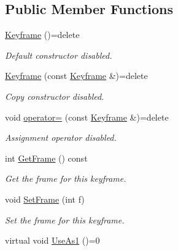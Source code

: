 \subsection*{Public Member Functions}
\begin{DoxyCompactItemize}
\item 
\hypertarget{class_c_anim_channel_1_1_keyframe_a88096d3eecc2aa502bae62906107c8c1}{\hyperlink{class_c_anim_channel_1_1_keyframe_a88096d3eecc2aa502bae62906107c8c1}{Keyframe} ()=delete}\label{class_c_anim_channel_1_1_keyframe_a88096d3eecc2aa502bae62906107c8c1}

\begin{DoxyCompactList}\small\item\em Default constructor disabled. \end{DoxyCompactList}\item 
\hypertarget{class_c_anim_channel_1_1_keyframe_a3f1c6e4c4eba22d6b8bdd6aa971d0200}{\hyperlink{class_c_anim_channel_1_1_keyframe_a3f1c6e4c4eba22d6b8bdd6aa971d0200}{Keyframe} (const \hyperlink{class_c_anim_channel_1_1_keyframe}{Keyframe} \&)=delete}\label{class_c_anim_channel_1_1_keyframe_a3f1c6e4c4eba22d6b8bdd6aa971d0200}

\begin{DoxyCompactList}\small\item\em Copy constructor disabled. \end{DoxyCompactList}\item 
\hypertarget{class_c_anim_channel_1_1_keyframe_a0b5fe25a49eba43386aa4e9e91ad3b54}{void \hyperlink{class_c_anim_channel_1_1_keyframe_a0b5fe25a49eba43386aa4e9e91ad3b54}{operator=} (const \hyperlink{class_c_anim_channel_1_1_keyframe}{Keyframe} \&)=delete}\label{class_c_anim_channel_1_1_keyframe_a0b5fe25a49eba43386aa4e9e91ad3b54}

\begin{DoxyCompactList}\small\item\em Assignment operator disabled. \end{DoxyCompactList}\item 
int \hyperlink{class_c_anim_channel_1_1_keyframe_ab772a5915170d21d88e9259dbed24191}{Get\+Frame} () const 
\begin{DoxyCompactList}\small\item\em Get the frame for this keyframe. \end{DoxyCompactList}\item 
void \hyperlink{class_c_anim_channel_1_1_keyframe_a19e0ffcf6eab8a2c9eef7cd35f0ca8d7}{Set\+Frame} (int f)
\begin{DoxyCompactList}\small\item\em Set the frame for this keyframe. \end{DoxyCompactList}\item 
\hypertarget{class_c_anim_channel_1_1_keyframe_ab299b5d67b1a6314421dd0d718f15493}{virtual void \hyperlink{class_c_anim_channel_1_1_keyframe_ab299b5d67b1a6314421dd0d718f15493}{Use\+As1} ()=0}\label{class_c_anim_channel_1_1_keyframe_ab299b5d67b1a6314421dd0d718f15493}


\end{DoxyCompactItemize}
